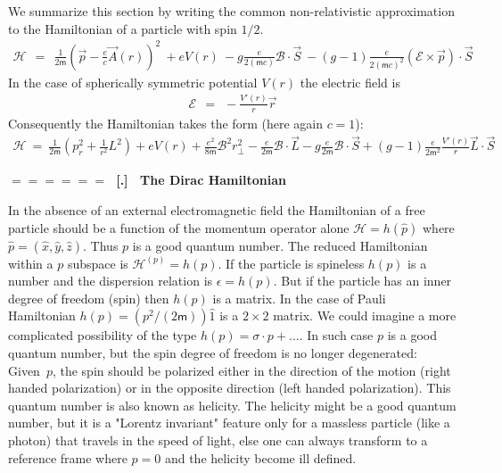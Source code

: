 \documentclass[onecolumn,fleqn]{revtex4}
\newcommand{\mass}{\mathsf{m}}
\newcommand{\beq}{\begin{eqnarray}}
\newcommand{\eeq}{\end{eqnarray}}
\renewcommand{\thesubsection}{\arabic{subsection}}
\renewcommand{\thesubsubsection}{\arabic{subsubsection}}
\newcommand{\sheadC}[1]
{
\addtocounter{subsubsection}{1}
\vspace{5mm}
{\Large\bf $=\!=\!=\!=\!=\!=\;$ [\thesubsection.\thesubsubsection] \ #1}  
\nopagebreak
\phantomsection
}
\begin{document}
We summarize this section by writing the common non-relativistic 
approximation to the Hamiltonian of a particle with spin $1/2$. 
\beq
\mathcal{H} \ \ = \ \ \frac{1}{2\mass}\left( \vec{p}-\frac{e}{c}\vec{A}(r) \right)^2
\ +eV(r) 
\ -g\frac{e}{2(\mass c)} \mathcal{B} \cdot \vec{S} 
\ -(g{-}1)\frac{e}{2(\mass c)^2} (\mathcal{E}\times \vec{p}) \cdot \vec{S} 
\eeq
In the case of spherically symmetric potential $V(r)$ 
the electric field is 
\beq
\mathcal{E} \ \ = \ \ - \frac{V'(r)}{r}\vec{r}
\eeq
Consequently the Hamiltonian takes the form (here again $c{=}1$):
\beq
\mathcal{H} 
\ = \  
\frac{1}{2\mass}\left( p_r^2 + \frac{1}{r^2} L^2 \right) 
+ eV(r) + \frac{e^2}{8\mass}\mathcal{B}^2 r_{\perp}^2
-\frac{e}{2\mass} \mathcal{B} \cdot \vec{L}
-g\frac{e}{2\mass} \mathcal{B} \cdot \vec{S}
+ (g{-}1)\frac{e}{2\mass^2}\frac{V'(r)}{r} \vec{L} \cdot \vec{S} 
\eeq





\newpage
\sheadC{The Dirac Hamiltonian}

In the absence of an external electromagnetic field the 
Hamiltonian of a free particle should be a function of 
the momentum operator alone $\mathcal{H}=h(\hat{p})$ 
where ${\hat{p}=(\hat{x},\hat{y},\hat{z})}$. 
Thus $p$ is a good quantum number. The reduced Hamiltonian 
within a $p$ subspace is $\mathcal{H}^{(p)}=h(p)$. 
If the particle is spineless $h(p)$ is a number 
and the dispersion relation is $\epsilon=h(p)$. 
But if the particle has an inner degree of freedom (spin) 
then $h(p)$ is a matrix. 
In the case of Pauli Hamiltonian ${h(p)=(p^2/(2\mass))\hat{1}}$ 
is a ${2 \times 2}$ matrix. We could imagine a more complicated 
possibility of the type ${h(p)= \sigma \cdot p + ...}$. 
In such case $p$ is a good quantum number, 
but the spin degree of freedom is no longer degenerated:   
Given~$p$, the spin should be polarized either 
in the direction of the motion (right handed polarization) 
or in the opposite direction (left handed polarization).
This quantum number is also known as helicity.
The helicity might be a good quantum number, 
but it is a "Lorentz invariant" feature only for 
a massless particle (like a photon) that travels 
in the speed of light, else one can always transform 
to a reference frame where $p=0$ 
and the helicity become ill defined.   
\end{document}
